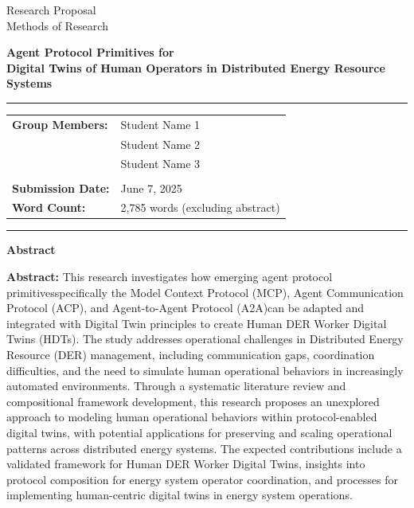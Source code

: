 \documentclass[12pt,a4paper]{article}
\newcommand{\studentone}{Student Name 1}
\newcommand{\studenttwo}{Student Name 2}
\newcommand{\studentthree}{Student Name 3}
\newcommand{\projecttitle}{Agent Protocol Primitives for \\Digital Twins of Human Operators in Distributed Energy Resource Systems}
\newcommand{\submissiondate}{June 7, 2025}
\newcommand{\emdash}{\textemdash}
\begin{document}
\begin{titlepage}
\begin{center}
{\Huge Research Proposal} \\
\vspace{5mm}
{\Large Methods of Research} \\

\vspace{10mm}

{\huge\textbf{\projecttitle}} \\

\vspace{15mm}

\hrule
\vspace{3mm}
\begin{tabular}{ll}
\textbf{Group Members:} & {\studentone} \\
& {\studenttwo} \\
& {\studentthree} \\
\\
\textbf{Submission Date:} & {\submissiondate} \\
\textbf{Word Count:} & 2,785 words (excluding abstract) \\
\end{tabular}
\vspace{3mm}
\hrule

\vspace{15mm}

\textbf{Abstract} \\
\vspace{2mm}
\begin{minipage}{0.8\textwidth}
\textbf{Abstract:} This research investigates how emerging agent protocol primitives\emdash{}specifically the Model Context Protocol (MCP), Agent Communication Protocol (ACP), and Agent-to-Agent Protocol (A2A)\emdash{}can be adapted and integrated with Digital Twin principles to create Human DER Worker Digital Twins (HDTs). The study addresses operational challenges in Distributed Energy Resource (DER) management, including communication gaps, coordination difficulties, and the need to simulate human operational behaviors in increasingly automated environments. Through a systematic literature review and compositional framework development, this research proposes an unexplored approach to modeling human operational behaviors within protocol-enabled digital twins, with potential applications for preserving and scaling operational patterns across distributed energy systems. The expected contributions include a validated framework for Human DER Worker Digital Twins, insights into protocol composition for energy system operator coordination, and processes for implementing human-centric digital twins in energy system operations.
\end{minipage}

\end{center}
\end{titlepage}
\end{document}
